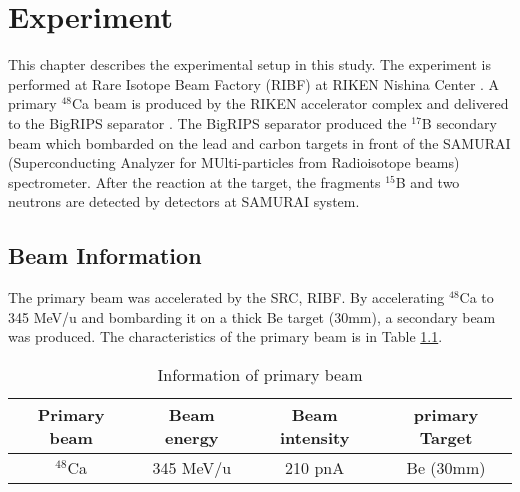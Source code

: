 \chapter{Experiment}
This chapter describes the experimental setup in this study. The experiment is performed at Rare Isotope Beam Factory (RIBF) at RIKEN Nishina Center \cite{RIKEN}. A primary ${}^{48}$Ca beam is produced by the RIKEN accelerator complex and delivered to the BigRIPS separator \cite{Kubo03}\cite{Kubo07}\cite{Kubo12}. The BigRIPS separator produced the ${}^{17}$B secondary beam which bombarded on the lead and carbon targets in front of the SAMURAI (Superconducting Analyzer for MUlti-particles from Radioisotope beams) spectrometer\cite{SAMURAI}. After the reaction at the target, the fragments ${}^{15}$B and two neutrons are detected by detectors at SAMURAI system. 


\section{Beam Information}
The primary beam was accelerated by the SRC, RIBF. By accelerating ${}^{48}$Ca to 345 MeV/u and bombarding it on a thick Be target (30mm), a secondary beam was produced. The characteristics of the primary beam is in Table \ref{tab:Primary_Beam}.

    \begin{table}[h]
        \centering 
            \begin{tabular}[]{c|c|c|c}
                \hline
                Primary beam & Beam energy & Beam intensity & primary Target  \\
                \hline 
                ${}^{48}$Ca & 345 MeV/u & 210 pnA & Be (30mm)\\
                \hline    
            \end{tabular}
        \caption{Information of primary beam}
        \label{tab:Primary_Beam}
    \end{table}

